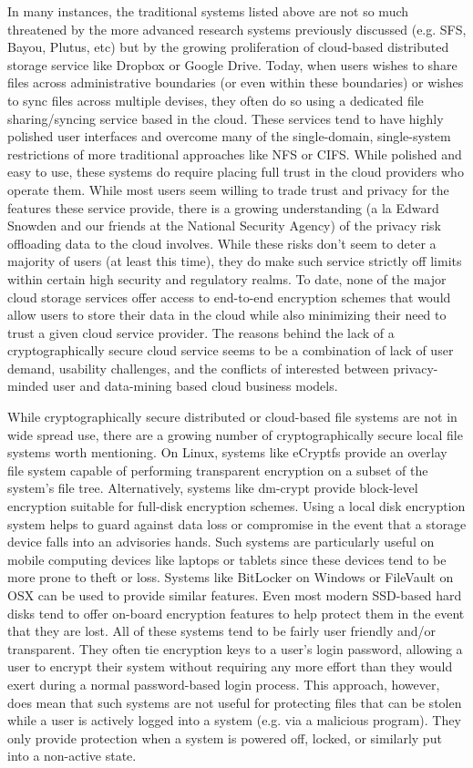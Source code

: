\documentclass{sig-alternate}
\begin{document}
In many instances, the traditional systems listed above are not so
much threatened by the more advanced research systems previously
discussed (e.g. SFS, Bayou, Plutus, etc) but by the growing
proliferation of cloud-based distributed storage service like Dropbox
or Google Drive. Today, when users wishes to share files across
administrative boundaries (or even within these boundaries) or wishes
to sync files across multiple devises, they often do so using a
dedicated file sharing/syncing service based in the cloud. These
services tend to have highly polished user interfaces and overcome
many of the single-domain, single-system restrictions of more
traditional approaches like NFS or CIFS. While polished and easy to
use, these systems do require placing full trust in the cloud
providers who operate them. While most users seem willing to trade
trust and privacy for the features these service provide, there is a
growing understanding (a la Edward Snowden and our friends at the
National Security Agency) of the privacy risk offloading data to the
cloud involves. While these risks don't seem to deter a majority of
users (at least this time), they do make such service strictly off
limits within certain high security and regulatory realms. To date,
none of the major cloud storage services offer access to end-to-end
encryption schemes that would allow users to store their data in the
cloud while also minimizing their need to trust a given cloud service
provider. The reasons behind the lack of a cryptographically secure
cloud service seems to be a combination of lack of user demand,
usability challenges, and the conflicts of interested between
privacy-minded user and data-mining based cloud business models.

While cryptographically secure distributed or cloud-based file systems
are not in wide spread use, there are a growing number of
cryptographically secure local file systems worth mentioning. On
Linux, systems like eCryptfs provide an overlay file system capable of
performing transparent encryption on a subset of the system's file
tree. Alternatively, systems like dm-crypt provide block-level
encryption suitable for full-disk encryption schemes. Using a local
disk encryption system helps to guard against data loss or compromise
in the event that a storage device falls into an advisories
hands. Such systems are particularly useful on mobile computing
devices like laptops or tablets since these devices tend to be more
prone to theft or loss. Systems like BitLocker on Windows or FileVault
on OSX can be used to provide similar features. Even most modern
SSD-based hard disks tend to offer on-board encryption features to
help protect them in the event that they are lost. All of these
systems tend to be fairly user friendly and/or transparent. They often
tie encryption keys to a user's login password, allowing a user to
encrypt their system without requiring any more effort than they would
exert during a normal password-based login process. This approach,
however, does mean that such systems are not useful for protecting
files that can be stolen while a user is actively logged into a system
(e.g. via a malicious program). They only provide protection when a
system is powered off, locked, or similarly put into a non-active
state.
\end{document}
